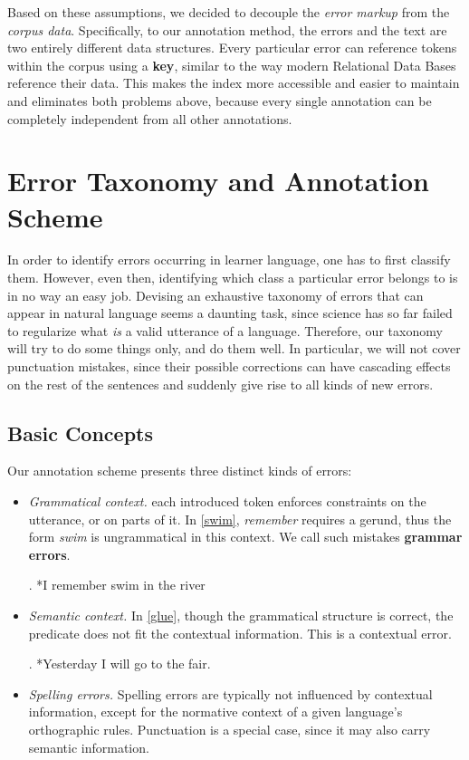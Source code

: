 \documentclass[12pt]{article}
\begin{document}
Based on these assumptions, we decided to decouple the \textit{error markup}
from the \textit{corpus data}. Specifically, to our annotation method, the
errors and the text are two entirely different data structures. Every
particular error can reference tokens within the corpus using a \textbf{key},
similar to the way modern Relational Data Bases reference their data. This makes
the index more accessible and easier to maintain and eliminates both problems
above, because every single annotation can be completely independent from all
other annotations.

\section{Error Taxonomy and Annotation Scheme}\label{sec:scheme}

In order to identify errors occurring in learner language, one has to first
classify them. However, even then, identifying which class a particular error
belongs to is in no way an easy job. Devising an exhaustive taxonomy of errors
that can appear in natural language seems a daunting task, since science has so
far failed to regularize what \textit{is} a valid utterance of a language.
Therefore, our taxonomy will try to do some things only, and do them well. In
particular, we will not cover punctuation mistakes, since their possible
corrections can have cascading effects on the rest of the sentences and suddenly
give rise to all kinds of new errors.

\subsection{Basic Concepts}\label{sec:threeholies}

Our annotation scheme presents three distinct kinds of errors:

\begin{itemize}
  \item \textit{Grammatical context.} each introduced token enforces constraints
  on the utterance, or on parts of it. In \ref{swim}, \textit{remember} requires
  a gerund, thus the form \textit{swim} is ungrammatical in this context. We
  call such mistakes \textbf{grammar errors}.

  \ex. *I remember swim in the river\label{swim}

  \item \textit{Semantic context.}  In \ref{glue}, though the grammatical
  structure is correct, the predicate does not fit the contextual information.
  This is a contextual error.

  \ex. *Yesterday I will go to the fair.\label{glue}

  \item \textit{Spelling errors.} Spelling errors are typically not influenced
  by contextual information, except for the normative context of a given
  language's orthographic rules. Punctuation is a special case, since it may
  also carry semantic information.

  \end{itemize}
\end{document}
